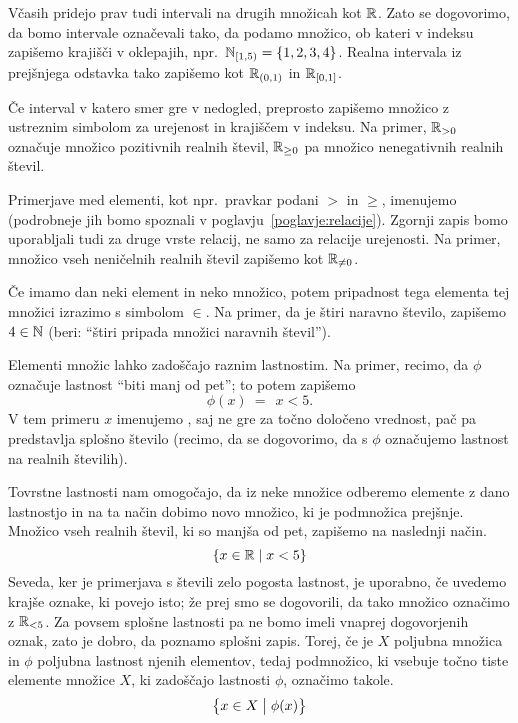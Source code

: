 Včasih pridejo prav tudi intervali na drugih množicah kot $\mathbb{R}$. Zato se dogovorimo, da bomo intervale označevali tako, da podamo množico, ob kateri v indeksu zapišemo krajišči v oklepajih, npr.~$\intco[\NN]{1}{5} = \set{1, 2, 3, 4}$. Realna intervala iz prejšnjega odstavka tako zapišemo kot ${\mathbb{R}}_{(0, 1)}$ in ${\mathbb{R}}_{[0, 1]}$.

Če interval v katero smer gre v nedogled, preprosto zapišemo množico z ustreznim simbolom za urejenost in krajiščem v indeksu. Na primer, $\mathbb{R}_{> 0}$ označuje množico pozitivnih realnih števil, $\mathbb{R}_{\geq 0}$ pa množico nenegativnih realnih števil.

Primerjave med elementi, kot npr.~pravkar podani $>$ in $\geq$, imenujemo  (podrobneje jih bomo spoznali v poglavju~\ref{poglavje:relacije}). Zgornji zapis bomo uporabljali tudi za druge vrste relacij, ne samo za relacije urejenosti. Na primer, množico vseh neničelnih realnih števil zapišemo kot $\mathbb{R}_{\neq 0}$.


Če imamo dan neki element in neko množico, potem pripadnost tega elementa tej množici izrazimo s simbolom $\in$. Na primer, da je štiri naravno število, zapišemo $4 \in \mathbb{N}$ (beri: ``štiri pripada množici naravnih števil'').

Elementi množic lahko zadoščajo raznim lastnostim. Na primer, recimo, da $\phi$ označuje lastnost ``biti manj od pet''; to potem zapišemo
\[\phi(x) \ = \ \ x < 5.\]
V tem primeru $x$ imenujemo , saj ne gre za točno določeno vrednost, pač pa predstavlja splošno število (recimo, da se dogovorimo, da s $\phi$ označujemo lastnost na realnih številih).

Tovrstne lastnosti nam omogočajo, da iz neke množice odberemo elemente z dano lastnostjo in na ta način dobimo novo množico, ki je podmnožica prejšnje. Množico vseh realnih števil, ki so manjša od pet, zapišemo na naslednji način.
\[\set{x \in \RR}{x < 5}\]
Seveda, ker je primerjava s števili zelo pogosta lastnost, je uporabno, če uvedemo krajše oznake, ki povejo isto; že prej smo se dogovorili, da tako množico označimo z $\mathbb{R}_{< 5}$. Za povsem splošne lastnosti pa ne bomo imeli vnaprej dogovorjenih oznak, zato je dobro, da poznamo splošni zapis. Torej, če je $X$ poljubna množica in $\phi$ poljubna lastnost njenih elementov, tedaj podmnožico, ki vsebuje točno tiste elemente množice $X$, ki zadoščajo lastnosti $\phi$, označimo takole.
\[\set[1]{x \in X}{\phi(x)}\]

